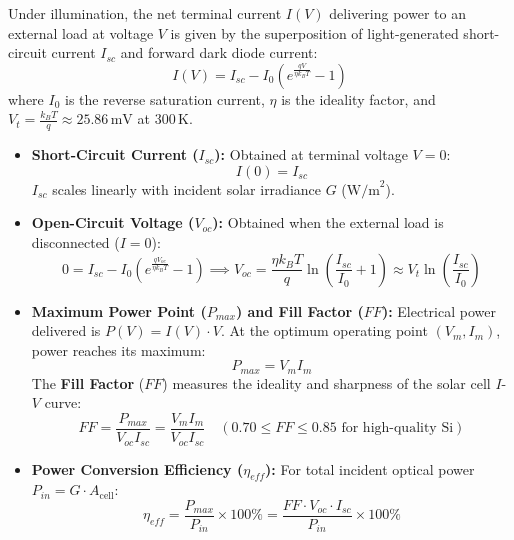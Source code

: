 \begin{derivationbox}
Under illumination, the net terminal current $I(V)$ delivering power to an external load at voltage $V$ is given by the superposition of light-generated short-circuit current $I_{sc}$ and forward dark diode current:
\begin{equation}
    I(V) = I_{sc} - I_0 \left(e^{\frac{qV}{\eta k_B T}} - 1\right)
\end{equation}
where $I_0$ is the reverse saturation current, $\eta$ is the ideality factor, and $V_t = \frac{k_B T}{q} \approx 25.86\,\text{mV}$ at $300\,\text{K}$.

\begin{itemize}
    \item \textbf{Short-Circuit Current ($I_{sc}$):} Obtained at terminal voltage $V = 0$:
    \begin{equation}
        I(0) = I_{sc}
    \end{equation}
    $I_{sc}$ scales linearly with incident solar irradiance $G$ ($\text{W/m}^2$).
    \item \textbf{Open-Circuit Voltage ($V_{oc}$):} Obtained when the external load is disconnected ($I = 0$):
    \begin{equation}
        0 = I_{sc} - I_0 \left(e^{\frac{qV_{oc}}{\eta k_B T}} - 1\right) \implies V_{oc} = \frac{\eta k_B T}{q} \ln\left(\frac{I_{sc}}{I_0} + 1\right) \approx V_t \ln\left(\frac{I_{sc}}{I_0}\right)
    \end{equation}
    \item \textbf{Maximum Power Point ($P_{max}$) and Fill Factor ($FF$):}
    Electrical power delivered is $P(V) = I(V) \cdot V$. At the optimum operating point $(V_m, I_m)$, power reaches its maximum:
    \begin{equation}
        P_{max} = V_m I_m
    \end{equation}
    The \textbf{Fill Factor} ($FF$) measures the ideality and sharpness of the solar cell $I$-$V$ curve:
    \begin{equation}
        FF = \frac{P_{max}}{V_{oc} I_{sc}} = \frac{V_m I_m}{V_{oc} I_{sc}} \quad (0.70 \le FF \le 0.85 \text{ for high-quality Si})
    \end{equation}
    \item \textbf{Power Conversion Efficiency ($\eta_{eff}$):}
    For total incident optical power $P_{in} = G \cdot A_{\text{cell}}$:
    \begin{equation}
        \eta_{eff} = \frac{P_{max}}{P_{in}} \times 100\% = \frac{FF \cdot V_{oc} \cdot I_{sc}}{P_{in}} \times 100\%
    \end{equation}
\end{itemize}
\end{derivationbox}

